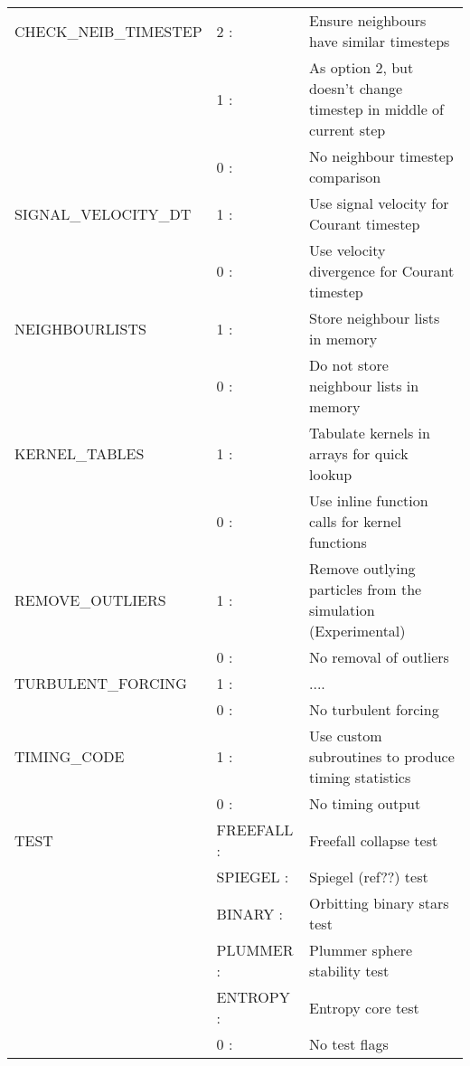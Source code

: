\documentclass[a4paper]{article}
\begin{document}
\begin{center}
\begin{supertabular}{|p{4.6cm}|p{4.6cm} p{6.4cm}|}
 CHECK\_NEIB\_TIMESTEP & 2 :& Ensure neighbours have similar timesteps \\
                       & 1 :& As option 2, but doesn't change timestep in middle of current step \\
                       & 0 :& No neighbour timestep comparison \\ \hline

 SIGNAL\_VELOCITY\_DT  & 1 :& Use signal velocity for Courant timestep \\
                       & 0 :& Use velocity divergence for Courant timestep \\ \hline

 NEIGHBOURLISTS & 1 :& Store neighbour lists in memory \\
                & 0 :& Do not store neighbour lists in memory \\ \hline

 KERNEL\_TABLES & 1 :& Tabulate kernels in arrays for quick lookup \\ 
                & 0 :& Use inline function calls for kernel functions \\ \hline

 REMOVE\_OUTLIERS & 1 :& Remove outlying particles from the simulation (Experimental) \\
                  & 0 :& No removal of outliers \\ \hline

 TURBULENT\_FORCING & 1 :& .... \\
                    & 0 :& No turbulent forcing \\ \hline

 TIMING\_CODE  & 1 :& Use custom subroutines to produce timing statistics \\
               & 0 :& No timing output \\ \hline

 TEST          & FREEFALL :& Freefall collapse test \\
               & SPIEGEL  :& Spiegel (ref??) test \\
               & BINARY   :& Orbitting binary stars test \\
               & PLUMMER  :& Plummer sphere stability test \\
               & ENTROPY  :& Entropy core test \\
               & 0        :& No test flags \\ \hline

\end{supertabular}
\end{center}
\vspace{1cm}
\end{document}
